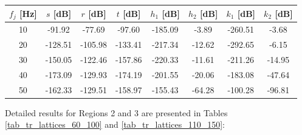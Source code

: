 \documentclass[review,numbers,sort&compress]{elsarticle}
\begin{document}
{\begin{table}[htb]
    \begin{tabular}{cccccccc}
        $f_j$ [Hz] & $s$  [dB] & $r$  [dB] & $t$  [dB] & $h_1$ [dB] & $h_2$ [dB] & $k_1$ [dB] & $k_2$ [dB] \\ \hline
        10         & -91.92            & -77.69                  & -97.60                & -185.09                & -3.89                  & -260.51               & -3.68                \\ \hline
        20         & -128.51           & -105.98                 & -133.41               & -217.34                & -12.62                 & -292.65               & -6.15                \\ \hline
        30         & -150.05           & -122.46                 & -157.86               & -220.33                & -11.61                 & -211.26               & -14.95               \\ \hline
        40         & -173.09           & -129.93                 & -174.19               & -201.55                & -20.06                 & -183.08               & -47.64               \\ \hline
        50         & -162.33           & -129.51                 & -158.97               & -155.43                & -64.28                 & -100.28               & -96.81               \\ \hline
    \end{tabular}
    \label{tab_tr_lattices_10_50}
\end{table}

Detailed results for Regions 2 and 3 are presented in Tables \ref{tab_tr_lattices_60_100} and \ref{tab_tr_lattices_110_150}:

}
\end{document}
